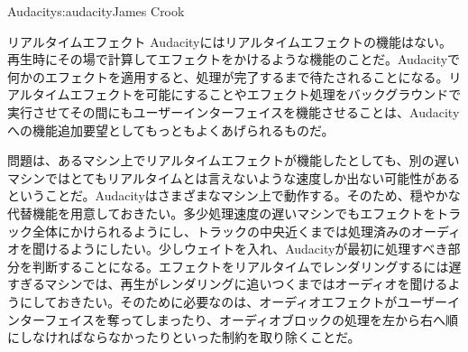 \begin{aosachapter}{Audacity}{s:audacity}{James Crook}
\begin{aosasect1}{リアルタイムエフェクト}
Audacityにはリアルタイムエフェクトの機能はない。再生時にその場で計算してエフェクトをかけるような機能のことだ。Audacityで何かのエフェクトを適用すると、処理が完了するまで待たされることになる。リアルタイムエフェクトを可能にすることやエフェクト処理をバックグラウンドで実行させてその間にもユーザーインターフェイスを機能させることは、Audacityへの機能追加要望としてもっともよくあげられるものだ。

問題は、あるマシン上でリアルタイムエフェクトが機能したとしても、別の遅いマシンではとてもリアルタイムとは言えないような速度しか出ない可能性があるということだ。Audacityはさまざまなマシン上で動作する。そのため、穏やかな代替機能を用意しておきたい。多少処理速度の遅いマシンでもエフェクトをトラック全体にかけられるようにし、トラックの中央近くまでは処理済みのオーディオを聞けるようにしたい。少しウェイトを入れ、Audacityが最初に処理すべき部分を判断することになる。エフェクトをリアルタイムでレンダリングするには遅すぎるマシンでは、再生がレンダリングに追いつくまではオーディオを聞けるようにしておきたい。そのために必要なのは、オーディオエフェクトがユーザーインターフェイスを奪ってしまったり、オーディオブロックの処理を左から右へ順にしなければならなかったりといった制約を取り除くことだ。


\end{aosasect1}
\end{aosachapter}
